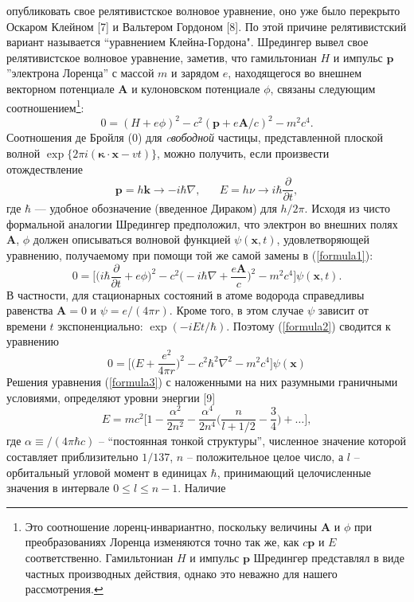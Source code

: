 \documentclass[a5paper,10pt]{article}
\begin{document}
\pagestyle{fancy}
\noindent опубликовать свое релятивистское волновое уравнение, оно уже было перекрыто Оскаром Клейном [7] и Вальтером Гордоном [8]. 
По этой причине релятивистский вариант называется ``уравнением Клейна-Гордона".
Шредингер вывел свое релятивистское волновое уравнение, заметив, что гамильтониан $H$ и импульс $\textbf{p}$ ''электрона Лоренца'' с массой $m$ и зарядом $e$, находящегося во внешнем векторном потенциале $\textbf{A}$ и кулоновском потенциале $\phi$, связаны следующим соотношением\footnote{Это соотношение лоренц-инвариантно, поскольку величины $\textbf{A}$ и $\phi$ при преобразованиях Лоренца изменяются точно так же, как $c\textbf{p}$ и $E$ соответственно. Гамильтониан $H$ и импульс $\textbf{p}$ Шредингер представлял в виде частных производных действия, однако это неважно для нашего рассмотрения.}:
\begin{equation}
\label{formula1}
0 = (H+e\phi )^2-c^2(\textbf{p} +e\textbf{A} /c)^2-m^2c^4.
\end{equation}
Соотношения де Бройля (0) для \textit{cвободной} частицы, представленной плоской волной $\exp \{ 2 \pi i( \boldsymbol {\kappa} \cdot \textbf{x} -vt) \} $, можно получить, если произвести отождествление
\begin{equation}
\textbf{p} = h\textbf{k}\rightarrow -i\hbar\nabla,\;\;\;\;\;\; E=h\nu \rightarrow i\hbar \frac{\partial}{\partial t},
\end{equation}
где $\hbar$ — удобное обозначение (введенное Дираком) для $h/2 \pi$. Исходя из чисто формальной аналогии Шредингер предположил, что электрон во внешних полях $\textbf{A}$, $\phi$ должен описываться волновой функцией $\psi(\textbf{x},t)$, удовлетворяющей уравнению, получаемому при помощи той же самой замены в (\ref{formula1}):
\begin{equation}
\label{formula2}
0 = \biggl[\biggl(i\hbar \frac{\partial}{\partial t}+e\phi \biggr)^2 - c^2\biggl(-i\hbar \nabla +\frac{e \textbf{A}}{c}\biggr)^2-m^2c^4\biggr]\psi (\textbf {x},t).
\end{equation}
В частности, для стационарных состояний в атоме водорода справедливы равенства $\textbf{A} = 0$ и $\psi = e/(4\pi r)$. Кроме того, в этом случае $\psi$ зависит от времени $t$ экспоненциально: $\exp(-iEt/\hbar)$. Поэтому (\ref{formula2}) сводится к уравнению
\begin{equation}
\label{formula3}
0 = \biggl[\biggl(E+\frac{e^2}{4\pi r}\biggr)^2-c^2\hbar^2\nabla^2-m^2c^4\biggr]\psi (\textbf{x})
\end{equation}
Решения уравнения (\ref{formula3}) с наложенными на них разумными граничными условиями, определяют уровни энергии [9]
\begin{equation}
E = mc^2\biggl[1-\frac{\alpha^2}{2n^2}-\frac{\alpha^4}{2n^4}\biggl(\frac{n}{l+1/2}-\frac{3}{4}\biggl)+\ldots \biggr],
\end{equation}
где $\alpha\equiv /(4\pi\hbar c)$ -- ``постоянная тонкой структуры'', численное значение которой составляет приблизительно $1/137$, $n$ -- положительное целое число, а $l$ -- орбитальный угловой момент в единицах $\hbar$, принимающий целочисленные значения в интервале $0\le l\le n-1$. Наличие
\end{document}
